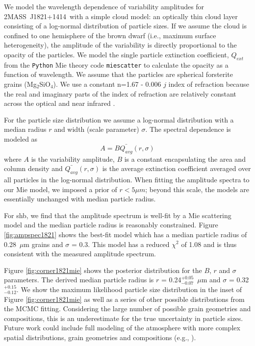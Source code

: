 \documentclass[twocolumn]{aastex6}
\newcommand{\sha}{2MASS~J0835$-$0819}
\newcommand{\shb}{2MASS~J1821+1414}
\begin{document}
We model the wavelength dependence of variability amplitudes for \shb\ with a simple cloud model: an optically thin cloud layer consisting of a log-normal distribution of particle sizes.
If we assume the cloud is confined to one hemisphere of the brown dwarf (i.e., maximum surface heterogeneity), the amplitude of the variability is directly proportional to the opacity of the particles.
We model the single particle extinction coefficient, $Q_{ext}$ from the \texttt{Python} Mie theory code \texttt{miescatter} \citep{bohren1983mie} to calculate the opacity as a function of wavelength.
We assume that the particles are spherical forsterite grains (Mg$_2$SiO$_4$).
We use a constant n=1.67 - 0.006 $j$ index of refraction because the real and imaginary parts of the index of refraction are relatively constant across the optical and near infrared \citep{scott1996forsterite}.


For the particle size distribution we assume a log-normal distribution with a median radius $r$ and width (scale parameter) $\sigma$.
The spectral dependence is modeled as 
\begin{equation}
A = B \bar{Q_{avg}}(r,\sigma)
\end{equation}
where $A$ is the variability amplitude, $B$ is a constant encapsulating the area and column density and $\bar{Q_{avg}}(r,\sigma)$ is the average extinction coefficient averaged over all particles in the log-normal distribution.
When fitting the amplitude spectra to our Mie model, we imposed a prior of $r < 5 \mu m$; beyond this scale, the models are essentially unchanged with median particle radius.

For {shb}, we find that the amplitude spectrum is well-fit by a Mie scattering model and the median particle radius is reasonably constrained.
Figure \ref{fig:ampspec1821} shows the best-fit model which has a median particle radius of 0.28~$\mu$m grains and $\sigma$ = 0.3.
This model has a reduced $\chi^2$ of 1.08 and is thus consistent with the measured amplitude spectrum.

Figure \ref{fig:corner1821mie} shows the posterior distribution for the $B$, $r$ and $\sigma$ parameters.
The derived median particle radius is $r$ = 0.24$^{+0.05}_{-0.07}$~$\mu$m 
and $\sigma$ = 0.32$^{+0.15}_{-0.12}$.
We show the maximum likelihood particle size distribution in the inset of Figure \ref{fig:corner1821mie} as well as a series of other possible distributions from the MCMC fitting.
Considering the large number of possible grain geometries and compositions, this is an underestimate for the true uncertainty in particle sizes.
Future work could include full modeling of the atmosphere with more complex spatial distributions, grain geometries and compositions (e.g., \citealt{2008ApJ...675L.105H}).
\end{document}
